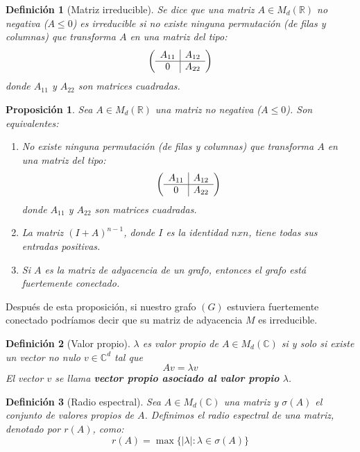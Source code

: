 \documentclass[size=a4, parskip=half, titlepage=false, toc=flat, toc=bib, 12pt]{scrartcl}
\theoremstyle{theorem-style}
\newtheorem{nprop}{Proposición}[section]
\theoremstyle{definition-style}
\newtheorem{ndef}{Definición}[section]
\theoremstyle{remark-style}
\theoremstyle{example-style}
\theoremstyle{definition-style}
\theoremstyle{remark-style}
\begin{document}
\begin{ndef}[Matriz irreducible]
Se dice que una matriz $A \in M_d(\mathbb{R})$ no negativa ($A \leq 0$) es irreducible si no existe ninguna permutación (de filas y columnas) que transforma $A$ en una matriz del tipo:
$$\left(
      \begin{array}{{c|c}}
            A_{11}    &    A_{12}  \\\hline
            0         &    A_{22}     \\
      \end{array}   \right)$$
donde $A_{11}$ y $A_{22}$ son matrices cuadradas.
\end{ndef}
\begin{nprop} Sea $A \in M_d(\mathbb{R})$ una matriz no negativa ($A \leq 0$). Son equivalentes:
\begin{enumerate}
\item No existe ninguna permutación (de filas y columnas) que transforma $A$ en una matriz del tipo:
$$\left(
      \begin{array}{{c|c}}
            A_{11}    &    A_{12}  \\\hline
            0         &    A_{22}     \\
      \end{array}   \right)$$
donde $A_{11}$ y $A_{22}$ son matrices cuadradas.
\item La matriz $(I + A)^{n - 1}$, donde $I$ es la identidad $n x n$, tiene todas sus entradas positivas.
\item Si $A$ es la matriz de adyacencia de un grafo, entonces el grafo está fuertemente conectado.
\end{enumerate}
\end{nprop}

Después de esta proposición, si nuestro grafo $(G)$ estuviera fuertemente conectado podríamos decir que su matriz de adyacencia $M$ es irreducible.

\begin{ndef}[Valor propio]
$\lambda$ es valor propio de $A \in M_d(\mathbb{C})$ si y solo si existe un vector no nulo $v \in \mathbb{C}^d$ tal que
$$Av = \lambda v$$
El vector $v$ se llama \textbf{vector propio asociado al valor propio} $\lambda$.
\end{ndef}

\begin{ndef}[Radio espectral]
Sea $A \in M_d(\mathbb{C})$ una matriz y $\sigma (A)$ el conjunto de valores propios de $A$. Definimos el radio espectral de una matriz, denotado por $r(A)$,  como:
$$r(A) = \max \{ | \lambda| : \lambda \in \sigma (A) \} $$
\end{ndef}
\end{document}
